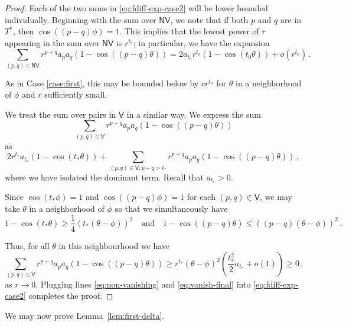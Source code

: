 \documentclass{daj}
\def\t{\theta}
\theoremstyle{definition}
\theoremstyle{remark}
\begin{document}
\begin{proof}
Each of the two sums in \eqref{eq:fdiff-exp-case2} will be lower bounded individually.  Beginning with the sum over $\mathsf{NV}$,
we note that if both $p$ and $q$ are in $T^\ast$, then $\cos((p-q)\phi) = 1$.  This implies that the lowest power of $r$ appearing in the sum over $\mathsf{NV}$ is $r^{t_0}$; in particular, we have the expansion \begin{equation} \label{eq:non-vanishing}
\sum_{(p,q) \in \mathsf{NV}} r^{p+q} a_p a_q(1 - \cos((p-q)\theta) ) = 2 a_{t_0} r^{t_0} (1 - \cos(t_0 \theta)) + o(r^{t_0})\,.
\end{equation}

As in Case \ref{case:first}, this may be bounded below by $c r^{t_0}$ for $\theta$ in a neighborhood of $\phi$ and $r$ sufficiently small.  

We treat the sum over pairs in $\mathsf{V}$ in a similar way. We express the sum 
\[ \sum_{(p,q) \in \mathsf{V}} r^{p+q} a_p a_q(1 - \cos((p-q)\theta) ) \]  as
\begin{equation}\label{eq:vanishing} 2 r^{t_\ast} a_{t_\ast} (1 - \cos(t_\ast \theta)) + \sum_{(p,q) \in \mathsf{V}: p+q > t_\ast} r^{p+q} a_p a_q(1 - \cos((p-q)\theta) )\, ,\end{equation}
where we have isolated the dominant term. Recall that $a_{t_\ast} >0$.

Since $\cos(t_\ast \phi) = 1$ and $\cos((p-q)\phi) = 1$ for each $(p,q) \in \mathsf{V}$, we may take $\theta$ in a neighborhood of $\phi$ so that we simultaneously have $$1 - \cos(t_\ast \theta) \geq \frac{1}{4}(t_\ast(\theta - \phi))^2\quad\mathrm{and}\quad 1 - \cos((p-q) \theta) \leq ((p-q)(\theta - \phi))^2\,.$$

Thus, for all $\t$ in this neighbourhood we have \begin{equation} \label{eq:vanish-final}
\sum_{(p,q) \in \mathsf{V}} r^{p+q} a_p a_q(1 - \cos((p-q)\theta) ) \geq r^{t_\ast}(\theta - \phi)^2\left(\frac{t_\ast^2}{2}a_{t_\ast} + o(1) \right) \geq 0\,,
\end{equation} as $r \rightarrow 0$.
%
Plugging lines \eqref{eq:non-vanishing} and \eqref{eq:vanish-final} into \eqref{eq:fdiff-exp-case2} completes the proof.
\end{proof}



\vspace{4mm}

We may now prove Lemma~\ref{lem:first-delta}.
\end{document}
